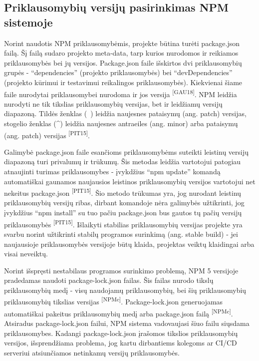 \subsection{Priklausomybių versijų pasirinkimas NPM sistemoje}

Norint naudotis NPM priklausomybėmis, projekte būtina turėti package.json failą. Šį failą
sudaro projekto meta-data, tarp kurios nurodomos ir reikiamos priklausomybės bei jų versijos. Package.json
faile išskirtos dvi priklausomybių grupės - \enquote{dependencies} (projekto priklausomybės) bei \enquote{devDependencies}
(projekto kūrimui ir testavimui reikalingos priklausomybės). Kiekvienai šiame faile nurodytai priklausomybei nurodoma ir jos versija \textsuperscript{[GAU18]}.
NPM leidžia nurodyti ne tik tikslias priklausomybių versijas, bet ir leidžiamų versijų diapazoną.
Tildės ženklas (~) leidžia naujesnes pataisymų (ang. patch) versijas,
stogelio ženklas (\textasciicircum) leidžia naujesnes antraeiles (ang. minor) arba pataisymų (ang. patch) versijas \textsuperscript{[PIT15]}.


Galimybė package.json faile esančioms priklausomybėms suteikti leistinų versijų diapazoną turi privalumų ir trūkumų.
Šis metodas leidžia vartotojui patogiau atnaujinti turimas priklausomybes - įvykdžius
\enquote{npm update} komandą automatiškai gaunamos naujausios leistinos priklausomybių versijos vartotojui net
nekeitus package.json \textsuperscript{[PIT15]}. Šio metodo trūkumas yra, jog nurodant leistinų priklausomybių versijų ribas,
dirbant komandoje nėra galimybės užtikrinti, jog įvykdžius \enquote{npm install} su tuo pačiu package.json bus gautos
tų pačių versijų priklausomybės \textsuperscript{[PIT15]}. Išlaikyti stabilias priklausomybių versijas projekte yra svarbu norint
užtikrinti stabilų programos surinkimą (ang. stable build) - jei naujausioje priklausomybės versijoje būtų
klaida, projektas veiktų klaidingai arba visai neveiktų.

Norint išspręsti nestabilaus programos surinkimo problemą, NPM 5 versijoje pradedamas naudoti
package-lock.json failas. Šis failas nurodo tikslų priklausomybių medį - visų naudojamų priklausomybių,
bei šių priklausomybių priklausomybių tikslias versijas \textsuperscript{[NPMc]}. Package-lock.json generuojamas automatiškai pakeitus priklausomybių medį
arba package.json failą \textsuperscript{[NPMc]}. Atsiradus package-lock.json failui, NPM sistema vadovaujasi šiuo failu siųsdama priklausomybes.
Kadangi package-lock.json įrašomos tikslios priklausomybių versijos, išsprendžiama problema,
jog kartu dirbantiems kolegoms ar CI/CD serveriui atsiunčiamos netinkamų versijų priklausomybės.

